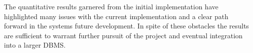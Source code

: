 \documentclass{article}
\begin{document}
The quantitative results garnered from the initial implementation have highlighted many issues with the current implementation and a clear path forward in the systems future development. In spite of these obstacles the results are sufficient to warrant further pursuit of the project and eventual integration into a larger DBMS.


\end{document}

